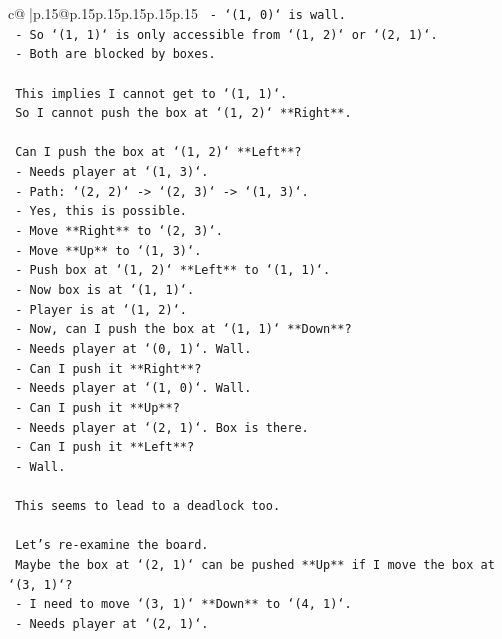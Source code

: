 \documentclass{article}
\begin{document}
{\begin{supertabular}{c@{$\;$}|p{.15\linewidth}@{}p{.15\linewidth}p{.15\linewidth}p{.15\linewidth}p{.15\linewidth}p{.15\linewidth}}
{{{\texttt{   {-} `(1, 0)` is wall.} \\
\texttt{   {-} So `(1, 1)` is only accessible from `(1, 2)` or `(2, 1)`.} \\
\texttt{   {-} Both are blocked by boxes.} \\
\\ 
\texttt{   This implies I cannot get to `(1, 1)`.} \\
\texttt{   So I cannot push the box at `(1, 2)` **Right**.} \\
\\ 
\texttt{   Can I push the box at `(1, 2)` **Left**?} \\
\texttt{   {-} Needs player at `(1, 3)`.} \\
\texttt{   {-} Path: `(2, 2)` {-}> `(2, 3)` {-}> `(1, 3)`.} \\
\texttt{   {-} Yes, this is possible.} \\
\texttt{   {-} Move **Right** to `(2, 3)`.} \\
\texttt{   {-} Move **Up** to `(1, 3)`.} \\
\texttt{   {-} Push box at `(1, 2)` **Left** to `(1, 1)`.} \\
\texttt{   {-} Now box is at `(1, 1)`.} \\
\texttt{   {-} Player is at `(1, 2)`.} \\
\texttt{   {-} Now, can I push the box at `(1, 1)` **Down**?} \\
\texttt{     {-} Needs player at `(0, 1)`. Wall.} \\
\texttt{   {-} Can I push it **Right**?} \\
\texttt{     {-} Needs player at `(1, 0)`. Wall.} \\
\texttt{   {-} Can I push it **Up**?} \\
\texttt{     {-} Needs player at `(2, 1)`. Box is there.} \\
\texttt{   {-} Can I push it **Left**?} \\
\texttt{     {-} Wall.} \\
\\ 
\texttt{   This seems to lead to a deadlock too.} \\
\\ 
\texttt{   Let's re{-}examine the board.} \\
\texttt{   Maybe the box at `(2, 1)` can be pushed **Up** if I move the box at `(3, 1)`?} \\
\texttt{   {-} I need to move `(3, 1)` **Down** to `(4, 1)`.} \\
\texttt{   {-} Needs player at `(2, 1)`.} \\
}}}
\end{supertabular}}
\end{document}
